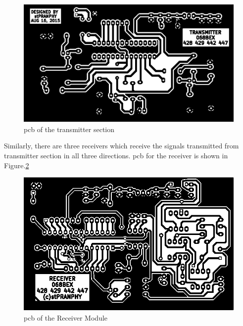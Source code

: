 \begin{figure}
	\centering
	\includegraphics{Images/TransmitterPCB.eps}
	\caption{\gls{pcb} of the transmitter section}
	\label{fig:TransmitterPCB}
\end{figure}

Similarly, there are three receivers which receive the signals transmitted from transmitter section in all three directions. \gls{pcb} for the receiver is shown in Figure.\ref{fig:ReceiverPCB}
\begin{figure}[htpb]
	\centering
	\includegraphics[scale=1]{Images/ReceiverModulePCB.eps}
	\caption{\gls{pcb} of the Receiver Module}
	\label{fig:ReceiverPCB}
\end{figure}

